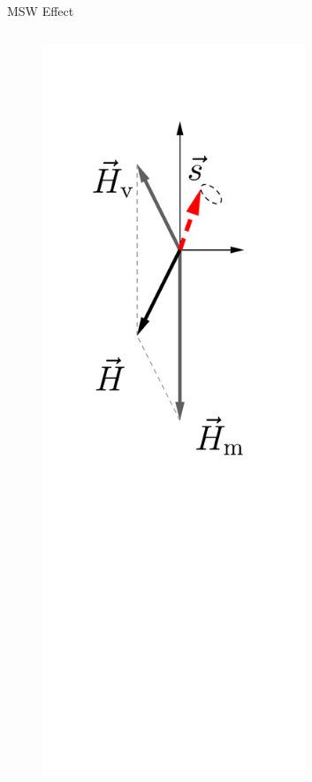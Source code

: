 \begin{frame}{MSW Effect}
\begin{columns}[T]
\begin{column}{0.33\textwidth}
\pause

\begin{figure}
    \centering
    \colorbox{white}{\includegraphics[width=0.7\textwidth]{assets/matter-effect-adiabatic}}
\end{figure}




\end{column}
\end{columns}
\end{frame}
